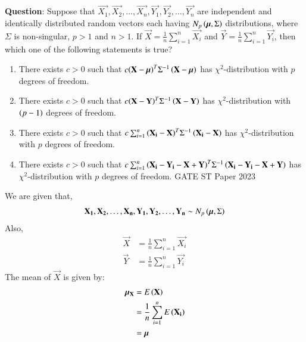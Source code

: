 \documentclass[journal,12pt,onecolumn]{IEEEtran}
\theoremstyle{remark}
\begin{document}
%
\textbf{Question}:
Suppose that $\vec{X_1}, \vec{X_2},\ldots, \vec{X_n}, \vec{Y_1}, \vec{Y_2},\ldots, \vec{Y_n}$ are independent and identically distributed random vectors each having $N_p\left(\bm{\mu},\Sigma\right)$ distributions, where $\Sigma$ is non-singular, $p>1$ and $n>1$. If $\vec{X} = \frac{1}{n}\sum_{i=1}^{n}\vec{X_i}$ and $\vec{Y} = \frac{1}{n}\sum_{i=1}^{n}\vec{Y_i}$, then which one of the following statements is true?
\begin{enumerate}[label=(\alph*)]
\item There exists $c>0$ such that $c{\left(\mathbf{X}-\bm{\mu}\right)}^T{\Sigma}^{-1}\left(\mathbf{X}-\bm{\mu}\right)$ has ${\chi}^2$-distribution with $p$ degrees of freedom.
\item There exists $c>0$ such that $c{\left(\mathbf{X}-\mathbf{Y}\right)^T}{\Sigma}^{-1}\left(\mathbf{X}-\mathbf{Y}\right)$ has ${\chi}^2$-distribution with $\left(p-1\right)$ degrees of freedom.
\item There exists $c>0$ such that $c\sum_{i=1}^n{\left(\mathbf{X_i}-\mathbf{X}\right)}^T{\Sigma}^{-1}\left(\mathbf{X_i}-\mathbf{X}\right)$ has ${\chi}^2$-distribution with $p$ degrees of freedom.
\item There exists $c>0$ such that $c\sum_{i=1}^n{\left(\mathbf{X_i}-\mathbf{Y_i}-\mathbf{X}+\mathbf{Y}\right)}^T{\Sigma}^{-1}\left(\mathbf{X_i}-\mathbf{Y_i}-\mathbf{X}+\mathbf{Y}\right)$ has ${\chi}^2$-distribution with $p$ degrees of freedom.   \hfill{GATE ST Paper 2023} 
\end{enumerate}    
\solution
\newline
We are given that,
\begin{align}
\mathbf{X_1}, \mathbf{X_2},\ldots, \mathbf{X_n}, \mathbf{Y_1}, \mathbf{Y_2},\ldots, \mathbf{Y_n} \sim N_p\left(\bm{\mu},\Sigma\right)
\end{align}
Also,
\begin{align}
\vec{X} &= \frac{1}{n}\sum_{i=1}^{n}\vec{X_i} \\
\vec{Y} &= \frac{1}{n}\sum_{i=1}^{n}\vec{Y_i} 
\end{align}
The mean of $\vec{X}$ is given by: 
\begin{align}
{\bm{\mu}}_{\mathbf{X}} &= E\left(\mathbf{X}\right) \\
                                    &= \frac{1}{n}\sum_{i=1}^{n}E\left(\mathbf{X_i}\right) \\
                                    &= \bm{\mu}  \label{eq:23/25/1}
\end{align}
\end{document}
